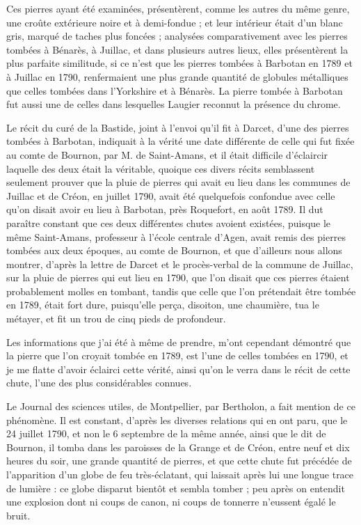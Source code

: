 \documentclass[a4paper, 12pt, oneside, french]{article}
\begin{document}
Ces pierres ayant été examinées, présentèrent, comme les autres du même genre, une croûte extérieure noire et à demi-fondue ; et leur intérieur était d'un blanc gris, marqué de taches plus foncées ; analysées comparativement avec les pierres tombées à Bénarès, à Juillac, et dans plusieurs autres lieux, elles présentèrent la plus parfaite similitude, si ce n'est que les pierres tombées à Barbotan en 1789 et à Juillac en 1790, renfermaient une plus grande quantité de globules métalliques que celles tombées dans l'Yorkshire et à Bénarès. La pierre tombée à Barbotan fut aussi une de celles dans lesquelles Laugier reconnut la présence du chrome.

Le récit du curé de la Bastide, joint à l'envoi qu'il fit à Darcet, d'une des pierres tombées à Barbotan, indiquait à la vérité une date différente de celle qui fut fixée au comte de Bournon, par M. de Saint-Amans, et il était difficile d'éclaircir laquelle des deux était la véritable, quoique ces divers récits semblassent seulement prouver que la pluie de pierres qui avait eu lieu dans les communes de Juillac et de Créon, en juillet 1790, avait été quelquefois confondue avec celle qu'on disait avoir eu lieu à Barbotan, près Roquefort, en août 1789. Il dut paraître constant que ces deux différentes chutes avoient existées, puisque le même Saint-Amans, professeur à l'école centrale d'Agen, avait remis des pierres tombées aux deux époques, au comte de Bournon, et que d'ailleurs nous allons montrer, d'après la lettre de Darcet et le procès-verbal de la commune de Juillac, sur la pluie de pierres qui eut lieu en 1790, que l'on disait que ces pierres étaient probablement molles en tombant, tandis que celle que l'on prétendait être tombée en 1789, était fort dure, puisqu'elle perça, disoiton, une chaumière, tua le métayer, et fit un trou de cinq pieds de profondeur.

Les informations que j'ai été à même de prendre, m'ont cependant démontré que la pierre que l'on croyait tombée en 1789, est l'une de celles tombées en 1790, et je me flatte d'avoir éclairci cette vérité, ainsi qu'on le verra dans le récit de cette chute, l'une des plus considérables connues.

Le Journal des sciences utiles, de Montpellier, par Bertholon, a fait mention de ce phénomène. Il est constant, d'après les diverses relations qui en ont paru, que le 24 juillet 1790, et non le 6 septembre de la même année, ainsi que le dit de Bournon, il tomba dans les paroisses de la Grange et de Créon, entre neuf et dix heures du soir, une grande quantité de pierres, et que cette chute fut précédée de l'apparition d'un globe de feu très-éclatant, qui laissait après lui une longue trace de lumière : ce globe disparut bientôt et sembla tomber ; peu après on entendit une explosion dont ni coups de canon, ni coups de tonnerre n'eussent égalé le bruit.
\end{document}
